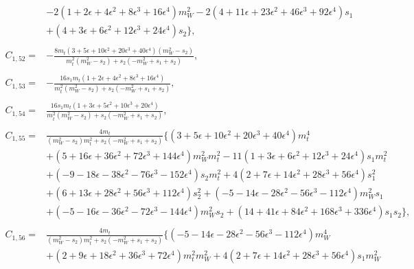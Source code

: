 \documentclass[twocolumn,aps,showpacs,nofootinbib,superscriptaddress,prd]{revtex4-2}
\begin{document}
\begin{widetext}
\begin{align}
\nonumber\\&
-2\left(1 +2 \epsilon +4 \epsilon^2 +8 \epsilon^3 +16 \epsilon^4\right)m_W^2-2\left(4 +11 \epsilon +23 \epsilon^2 +46 \epsilon^3 +92 \epsilon^4\right)s_1
\nonumber\\&
+\left(4 +3 \epsilon +6 \epsilon^2 +12 \epsilon^3 +24 \epsilon^4\right)s_2\}
,\nonumber\\
\nonumber\\
C_{1,52}=&-\frac{8m_t\left(3 +5 \epsilon +10 \epsilon^2 +20 \epsilon^3 +40 \epsilon^4\right)\left(m_W^2-s_2\right)}{m_t^2
\left(m_W^2-s_2\right)+s_2\left(-m_W^2+s_1+s_2\right)}
,\nonumber\\
\nonumber\\
C_{1,53}=&-\frac{16s_1m_t\left(1 +2 \epsilon +4 \epsilon^2 +8 \epsilon^3 +16 \epsilon^4\right)}{m_t^2\left(m_W^2-s_2\right)+s_2
\left(-m_W^2+s_1+s_2\right)}
,\nonumber\\
\nonumber\\
C_{1,54}=&\frac{16s_1m_t\left(1 +3 \epsilon +5 \epsilon^2 +10 \epsilon^3 +20 \epsilon^4\right)}{m_t^2\left(m_W^2-s_2\right)+s_2
\left(-m_W^2+s_1+s_2\right)}
,\nonumber\\
\nonumber\\
C_{1,55}=&\frac{4m_t}{\left(m_W^2-s_2\right)m_t^2+s_2\left(-m_W^2+s_1+s_2\right)}\{\left(3 +5 \epsilon +10 \epsilon^2 +20 \epsilon^3 +40 \epsilon^4\right)m_t^4
\nonumber\\&
+\left(5 +16 \epsilon +36 \epsilon^2 +72 \epsilon^3 +144 \epsilon^4\right)m_W^2m_t^2-11\left(1 +3 \epsilon +6 \epsilon^2 +12 \epsilon^3 +24 \epsilon^4\right)s_1m_t^2
\nonumber\\&
+\left(-9 -18 \epsilon -38 \epsilon^2 -76 \epsilon^3 -152 \epsilon^4\right)s_2m_t^2+4\left(2 +7 \epsilon +14 \epsilon^2 +28 \epsilon^3 +56 \epsilon^4\right)s_1^2
\nonumber\\&
+\left(6 +13 \epsilon +28 \epsilon^2 +56 \epsilon^3 +112 \epsilon^4\right)s_2^2+\left(-5 -14 \epsilon -28 \epsilon^2 -56 \epsilon^3 -112 \epsilon^4\right)m_W^2s_1
\nonumber\\&
+\left(-5 -16 \epsilon -36 \epsilon^2 -72 \epsilon^3 -144 \epsilon^4\right)m_W^2s_2+\left(14 +41\epsilon +84 \epsilon^2 +168 \epsilon^3 +336 \epsilon^4\right)s_1s_2\}
,\nonumber\\
\nonumber\\
C_{1,56}=&\frac{4m_t}{\left(m_W^2-s_2\right)m_t^2+s_2\left(-m_W^2+s_1+s_2\right)}\{\left(-5 -14 \epsilon -28 \epsilon^2 -56 \epsilon^3 -112 \epsilon^4\right)m_W^4
\nonumber\\&
+\left(2 +9 \epsilon +18 \epsilon^2 +36 \epsilon^3 +72 \epsilon^4\right)m_t^2m_W^2+4\left(2 +7 \epsilon +14 \epsilon^2 +28 \epsilon^3 +56 \epsilon^4\right)s_1m_W^2

\end{align}
\end{widetext}
\end{document}
